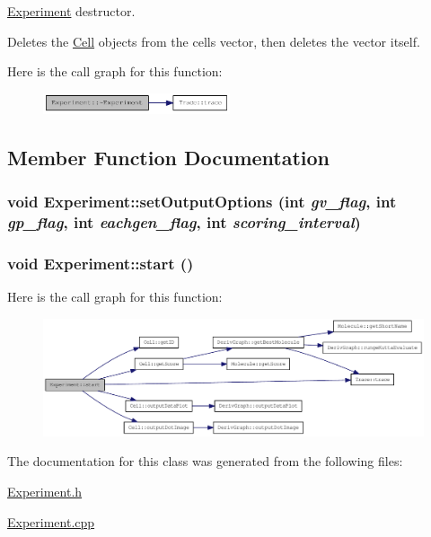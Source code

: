 \hyperlink{classExperiment}{Experiment} destructor.

Deletes the \hyperlink{classCell}{Cell} objects from the cells vector, then deletes the vector itself. 

Here is the call graph for this function:\nopagebreak
\begin{figure}[H]
\begin{center}
\leavevmode
\includegraphics[width=156pt]{classExperiment_a96058d848040e45948bbb60623711da6_cgraph}
\end{center}
\end{figure}


\subsection{Member Function Documentation}
\hypertarget{classExperiment_a7597c63f9fe2f8dede62dbe79202bf61}{
\subsubsection[{setOutputOptions}]{\setlength{\rightskip}{0pt plus 5cm}void Experiment::setOutputOptions (int {\em gv\_\-flag}, \/  int {\em gp\_\-flag}, \/  int {\em eachgen\_\-flag}, \/  int {\em scoring\_\-interval})}}
\label{classExperiment_a7597c63f9fe2f8dede62dbe79202bf61}
\hypertarget{classExperiment_ab15fca04be9b7bcad65b264b23b4a499}{
\subsubsection[{start}]{\setlength{\rightskip}{0pt plus 5cm}void Experiment::start ()}}
\label{classExperiment_ab15fca04be9b7bcad65b264b23b4a499}


Here is the call graph for this function:\nopagebreak
\begin{figure}[H]
\begin{center}
\leavevmode
\includegraphics[width=370pt]{classExperiment_ab15fca04be9b7bcad65b264b23b4a499_cgraph}
\end{center}
\end{figure}


The documentation for this class was generated from the following files:\begin{DoxyCompactItemize}
\item 
\hyperlink{Experiment_8h}{Experiment.h}\item 
\hyperlink{Experiment_8cpp}{Experiment.cpp}\end{DoxyCompactItemize}
